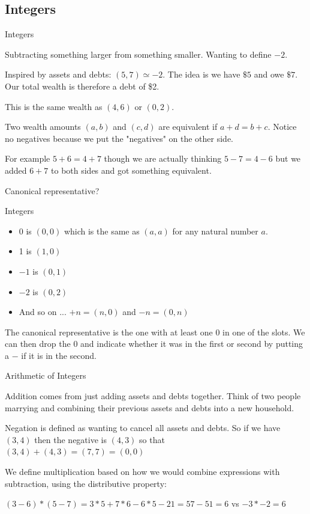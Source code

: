 \documentclass{beamer}
\begin{document}
\subsection{Integers}

\begin{frame}{Integers}

Subtracting something larger from something smaller. Wanting to define $-2$.

Inspired by assets and debts:  $(5, 7) \simeq -2$. The idea is we have $\$5$ and owe $\$7$. Our total wealth is therefore a debt of \$2. 

This is the same wealth as $(4,6)$ or $(0,2)$.

Two wealth amounts $(a,b)$ and $(c,d)$ are equivalent if $a+d = b+c$. Notice no negatives because we put the "negatives" on the other side.

For example $5+6 = 4+7$ though we are actually thinking $5-7 = 4-6$ but we added $6+7$ to both sides and got something equivalent. 

Canonical representative? 

\end{frame}

\begin{frame}{Integers}

\begin{itemize}
    \item 0 is  $(0,0)$ which is the same as $(a,a)$ for any natural number $a$.
    \item 1 is  $(1,0)$
    \item $-1$ is $(0,1)$
    \item $-2$ is $(0,2)$
    \item And so on ... $+n = (n, 0)$ and $-n = (0,n)$
\end{itemize}

The canonical representative is the one with at least one 0 in one of the slots. We can then drop the 0 and indicate whether it was in the first or second by putting a $-$ if it is in the second. 


\end{frame}

\begin{frame}{Arithmetic of Integers}

Addition comes from just adding assets and debts together. Think of two people marrying and combining their previous assets and debts into a new household. 

Negation is defined as wanting to cancel all assets and debts. So if we have $(3,4)$ then the negative is $(4,3)$ so that $(3,4) + (4,3) = (7,7) = (0,0)$

We define multiplication based on how we would combine expressions with subtraction, using the distributive property: 

$(3-6)*(5-7) = 3*5 + 7*6 - 6*5 - 21 = 57 - 51=6$ vs $-3*-2 = 6$ 


\end{frame}
\end{document}
